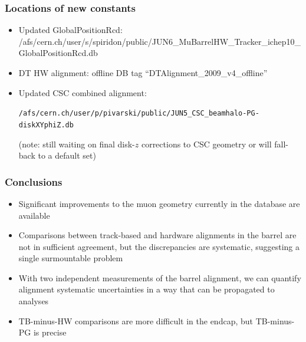 \documentclass[compress]{beamer}
\begin{document}

\begin{frame}
\frametitle{Locations of new constants}
\begin{itemize}\setlength{\itemsep}{1 cm}
\item Updated GlobalPositionRcd: {\tiny /afs/cern.ch/user/s/spiridon/public/JUN6\_MuBarrelHW\_Tracker\_ichep10\_GlobalPositionRcd.db}

\item DT HW alignment: offline DB tag ``DTAlignment\_2009\_v4\_offline''
\item Updated CSC combined alignment:

{\tt \scriptsize /afs/cern.ch/user/p/pivarski/public/JUN5\_CSC\_beamhalo-PG-diskXYphiZ.db}

(note: still waiting on final disk-$z$ corrections to CSC geometry or will fall-back to a default set)

\end{itemize}
\end{frame}

\begin{frame}
\frametitle{Conclusions}
\begin{itemize}\setlength{\itemsep}{0.5 cm}
\item Significant improvements to the muon geometry currently in the
  database are available
\item Comparisons between track-based and hardware alignments in the
  barrel are not in sufficient agreement, but the discrepancies are
  systematic, suggesting a single surmountable problem
\item With two independent measurements of the barrel alignment, we
  can quantify alignment systematic uncertainties in a way that can be
  propagated to analyses
\item TB-minus-HW comparisons are more difficult in the endcap, but
  TB-minus-PG is precise
\end{itemize}
\label{numpages}
\end{frame}
\end{document}
